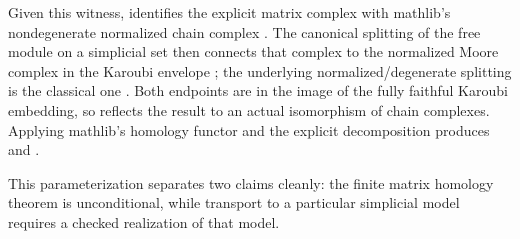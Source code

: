Given this witness,  identifies the explicit matrix complex
with mathlib's nondegenerate normalized chain complex
\citep{mathlib4320normalizedChains}.  The canonical splitting of the free
module on a simplicial set then connects that complex to the normalized Moore
complex in the Karoubi envelope \citep{mathlib4320normalizedMoore}; the underlying
normalized/degenerate splitting is the classical one
\citep[Lemma 8.3.7 and Theorem 8.3.8]{weibel1994simplicial}.  Both endpoints are
in the image of the fully faithful Karoubi embedding, so
 reflects the result to an actual isomorphism
of chain complexes.  Applying mathlib's homology functor and the explicit
decomposition produces  and
.

This parameterization separates two claims cleanly: the finite matrix
homology theorem is unconditional, while transport to a particular
simplicial model requires a checked realization of that model.
